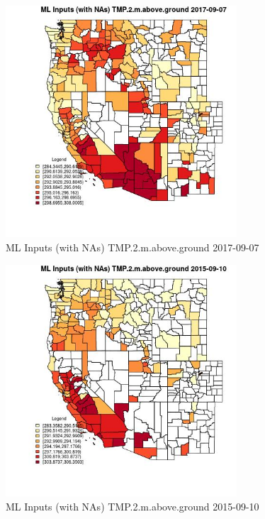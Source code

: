 \begin{figure} 
\centering  
\includegraphics[width=0.77\textwidth]{Code_Outputs/Report_ML_input_PM25_Step4_part_e_de_duplicated_aves_compiled_2019-05-21wNAs_CountyTMP2mabovegroundMean2017-09-07.jpg} 
\caption{\label{fig:Report_ML_input_PM25_Step4_part_e_de_duplicated_aves_compiled_2019-05-21wNAsCountyTMP2mabovegroundMean2017-09-07}ML Inputs (with NAs) TMP.2.m.above.ground 2017-09-07} 
\end{figure} 
 

\begin{figure} 
\centering  
\includegraphics[width=0.77\textwidth]{Code_Outputs/Report_ML_input_PM25_Step4_part_e_de_duplicated_aves_compiled_2019-05-21wNAs_CountyTMP2mabovegroundMean2015-09-10.jpg} 
\caption{\label{fig:Report_ML_input_PM25_Step4_part_e_de_duplicated_aves_compiled_2019-05-21wNAsCountyTMP2mabovegroundMean2015-09-10}ML Inputs (with NAs) TMP.2.m.above.ground 2015-09-10} 
\end{figure} 
 

